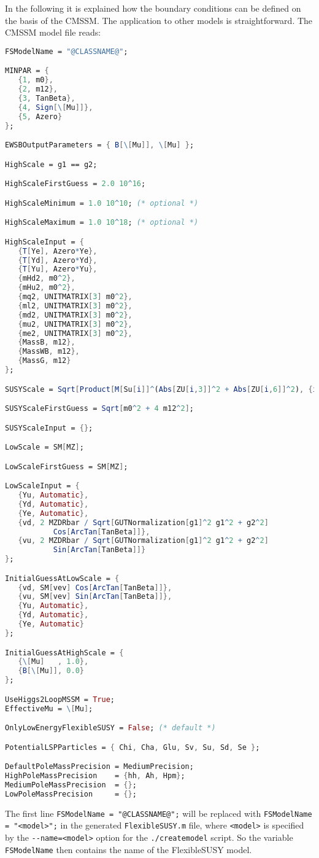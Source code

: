 \documentclass[final,3p,11pt,pdflatex]{elsarticle}
\makeatletter
\newcommand{\fs}{FlexibleSUSY\@\xspace}
\newcommand{\code}[1]{\lstinline|#1|}  %
\makeatother
\begin{document}
In the following it is explained how the
boundary conditions can be defined on the basis of the CMSSM.  The
application to other models is straightforward.  The CMSSM model file
reads:
%
\begin{lstlisting}[language=Mathematica]
FSModelName = "@CLASSNAME@";

MINPAR = {
   {1, m0},
   {2, m12},
   {3, TanBeta},
   {4, Sign[\[Mu]]},
   {5, Azero}
};

EWSBOutputParameters = { B[\[Mu]], \[Mu] };

HighScale = g1 == g2;

HighScaleFirstGuess = 2.0 10^16;

HighScaleMinimum = 1.0 10^10; (* optional *)

HighScaleMaximum = 1.0 10^18; (* optional *)

HighScaleInput = {
   {T[Ye], Azero*Ye},
   {T[Yd], Azero*Yd},
   {T[Yu], Azero*Yu},
   {mHd2, m0^2},
   {mHu2, m0^2},
   {mq2, UNITMATRIX[3] m0^2},
   {ml2, UNITMATRIX[3] m0^2},
   {md2, UNITMATRIX[3] m0^2},
   {mu2, UNITMATRIX[3] m0^2},
   {me2, UNITMATRIX[3] m0^2},
   {MassB, m12},
   {MassWB, m12},
   {MassG, m12}
};

SUSYScale = Sqrt[Product[M[Su[i]]^(Abs[ZU[i,3]]^2 + Abs[ZU[i,6]]^2), {i,6}]];

SUSYScaleFirstGuess = Sqrt[m0^2 + 4 m12^2];

SUSYScaleInput = {};

LowScale = SM[MZ];

LowScaleFirstGuess = SM[MZ];

LowScaleInput = {
   {Yu, Automatic},
   {Yd, Automatic},
   {Ye, Automatic},
   {vd, 2 MZDRbar / Sqrt[GUTNormalization[g1]^2 g1^2 + g2^2]
           Cos[ArcTan[TanBeta]]},
   {vu, 2 MZDRbar / Sqrt[GUTNormalization[g1]^2 g1^2 + g2^2]
           Sin[ArcTan[TanBeta]]}
};

InitialGuessAtLowScale = {
   {vd, SM[vev] Cos[ArcTan[TanBeta]]},
   {vu, SM[vev] Sin[ArcTan[TanBeta]]},
   {Yu, Automatic},
   {Yd, Automatic},
   {Ye, Automatic}
};

InitialGuessAtHighScale = {
   {\[Mu]   , 1.0},
   {B[\[Mu]], 0.0}
};

UseHiggs2LoopMSSM = True;
EffectiveMu = \[Mu];

OnlyLowEnergyFlexibleSUSY = False; (* default *)

PotentialLSPParticles = { Chi, Cha, Glu, Sv, Su, Sd, Se };

DefaultPoleMassPrecision = MediumPrecision;
HighPoleMassPrecision    = {hh, Ah, Hpm};
MediumPoleMassPrecision  = {};
LowPoleMassPrecision     = {};
\end{lstlisting}
%
The first line \code{FSModelName = "@CLASSNAME@";} will be replaced
with \code{FSModelName = "<model>";} in the generated
\code{FlexibleSUSY.m} file, where \code{<model>} is specified by the
\code{--name=<model>} option for the \code{./createmodel} script.  So
the variable \code{FSModelName} then contains the name of the \fs
model.
\end{document}
